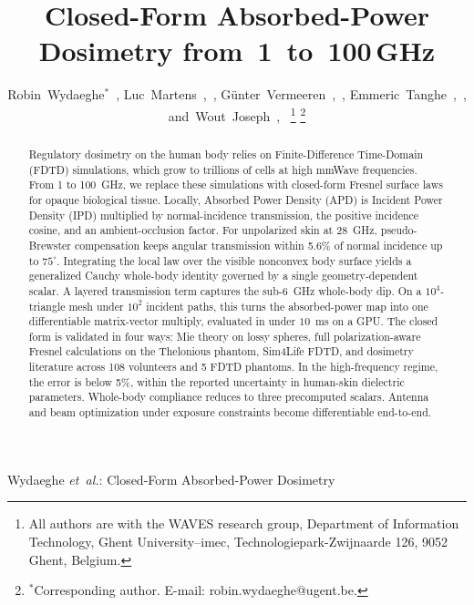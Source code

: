 \documentclass[journal,twocolumn,10pt]{IEEEtran}
\begin{document}
\title{Closed-Form Absorbed-Power Dosimetry from~1~to~100\,GHz}

\author{Robin~Wydaeghe$^{*}$~,
  Luc~Martens~,~,
  G\"unter~Vermeeren~,~,
  Emmeric~Tanghe~,~,
  and~Wout~Joseph~,~%
  \thanks{All authors are with the WAVES research group, Department of
  Information Technology, Ghent University--imec, Technologiepark-Zwijnaarde
  126, 9052 Ghent, Belgium.}%
  \thanks{$^{*}$Corresponding author. E-mail: robin.wydaeghe@ugent.be.}}

%
{Wydaeghe \MakeLowercase{\textit{et~al.}}: Closed-Form
Absorbed-Power Dosimetry}

\maketitle

\begin{abstract}
Regulatory dosimetry on the human body relies on Finite-Difference
Time-Domain (FDTD) simulations, which grow to trillions of cells at
high mmWave frequencies. From 1 to 100~GHz, we replace these
simulations with closed-form Fresnel surface laws for opaque
biological tissue. Locally, Absorbed Power Density (APD) is Incident
Power Density (IPD) multiplied by normal-incidence transmission, the positive
incidence cosine, and an ambient-occlusion factor. For
unpolarized skin at 28~GHz, pseudo-Brewster compensation keeps
angular transmission within 5.6\% of normal incidence up to
$75^\circ$. Integrating the local law over the visible nonconvex body
surface yields a generalized Cauchy whole-body identity governed by a
single geometry-dependent scalar. A layered transmission term captures the sub-6~GHz
whole-body dip. On a $10^4$-triangle mesh under $10^2$ incident
paths, this turns the absorbed-power map into one differentiable
matrix-vector multiply, evaluated in under $10$~ms on a GPU. The
closed form is validated in four ways: Mie theory on lossy spheres,
full polarization-aware Fresnel calculations on the Thelonious
phantom, Sim4Life FDTD, and dosimetry literature across 108
volunteers and 5 FDTD phantoms. In the high-frequency regime, the
error is below 5\%, within the reported uncertainty in human-skin
dielectric parameters. Whole-body compliance reduces to three
precomputed scalars. Antenna and beam optimization under exposure
constraints become differentiable end-to-end.
\end{abstract}
\end{document}
